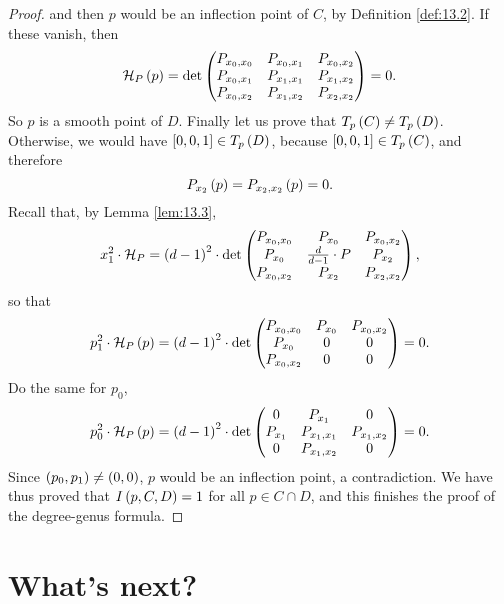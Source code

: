 \begin{proof}
and then $ p $ would be an inflection point of $ C $, by Definition \ref{def:13.2}. If these vanish, then
$$ \mathcal{H}_P\left( p \right) = \det\begin{pmatrix} P_{x_0, x_0} & P_{x_0, x_1} & P_{x_0, x_2} \\ P_{x_0, x_1} & P_{x_1, x_1} & P_{x_1, x_2} \\ P_{x_0, x_2} & P_{x_1, x_2} & P_{x_2, x_2} \end{pmatrix} = 0. $$
So $ p $ is a smooth point of $ D $. Finally let us prove that $ T_p\left( C \right) \ne T_p\left( D \right) $. Otherwise, we would have $ \left[ 0, 0, 1 \right] \in T_p\left( D \right) $, because $ \left[ 0, 0, 1 \right] \in T_p\left( C \right) $, and therefore
$$ P_{x_2}\left( p \right) = P_{x_2, x_2}\left( p \right) = 0. $$
Recall that, by Lemma \ref{lem:13.3},
$$ x_1^2 \cdot \mathcal{H}_P = \left( d - 1 \right)^2 \cdot \det\begin{pmatrix} P_{x_0, x_0} & P_{x_0} & P_{x_0, x_2} \\ P_{x_0} & \tfrac{d}{d - 1} \cdot P & P_{x_2} \\ P_{x_0, x_2} & P_{x_2} & P_{x_2, x_2} \end{pmatrix}, $$
so that
$$ p_1^2 \cdot \mathcal{H}_P\left( p \right) = \left( d - 1 \right)^2 \cdot \det\begin{pmatrix} P_{x_0, x_0} & P_{x_0} & P_{x_0, x_2} \\ P_{x_0} & 0 & 0 \\ P_{x_0, x_2} & 0 & 0 \end{pmatrix} = 0. $$
Do the same for $ p_0 $,
$$ p_0^2 \cdot \mathcal{H}_P\left( p \right) = \left( d - 1 \right)^2 \cdot \det\begin{pmatrix} 0 & P_{x_1} & 0 \\ P_{x_1} & P_{x_1, x_1} & P_{x_1, x_2} \\ 0 & P_{x_1, x_2} & 0 \end{pmatrix} = 0. $$
Since $ \left( p_0, p_1 \right) \ne \left( 0, 0 \right) $, $ p $ would be an inflection point, a contradiction. We have thus proved that $ I\left( p, C, D \right) = 1 $ for all $ p \in C \cap D $, and this finishes the proof of the degree-genus formula.
\end{proof}

\pagebreak

\section{What's next?}

